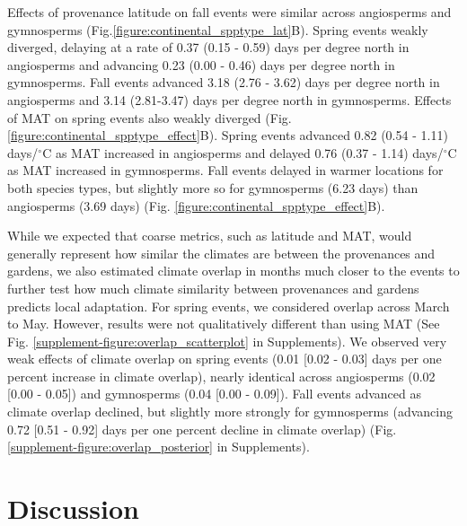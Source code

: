 \documentclass{article}
\begin{document}
Effects of provenance latitude on fall events were similar across angiosperms and gymnosperms (Fig.\ref{figure:continental_spptype_lat}B). Spring events weakly diverged, delaying at a rate of 0.37 (0.15 - 0.59) days per degree north in angiosperms and advancing 0.23 (0.00 - 0.46) days per degree north in gymnosperms. Fall events advanced 3.18 (2.76 - 3.62) days per degree north in angiosperms and 3.14 (2.81-3.47) days per degree north in gymnosperms.
Effects of MAT on spring events also weakly diverged (Fig.\ref{figure:continental_spptype_effect}B). Spring events advanced 0.82 (0.54 - 1.11) days/$^{\circ}$C as MAT increased in angiosperms and delayed 0.76 (0.37 - 1.14) days/$^{\circ}$C as MAT increased in gymnosperms. Fall events delayed in warmer locations for both species types, but slightly more so for gymnosperms (6.23 days) than angiosperms (3.69 days) (Fig. \ref{figure:continental_spptype_effect}B).

While we expected that coarse metrics, such as latitude and MAT, would generally represent how similar the climates are between the provenances and gardens, we also estimated climate overlap in months much closer to the events to further test how much climate similarity between provenances and gardens predicts local adaptation. For spring events, we considered overlap across March to May. However, results were not qualitatively different than using MAT (See Fig. \ref{supplement-figure:overlap_scatterplot} in Supplements). We observed very weak effects of climate overlap on spring events (0.01 [0.02 - 0.03] days per one percent increase in climate overlap), nearly identical across angiosperms (0.02 [0.00 - 0.05]) and gymnosperms (0.04 [0.00 - 0.09]). Fall events advanced as climate overlap declined, but slightly more strongly for gymnosperms (advancing 0.72 [0.51 - 0.92] days per one percent decline in climate overlap) (Fig.\ref{supplement-figure:overlap_posterior} in Supplements).


\section{Discussion}
\end{document}
